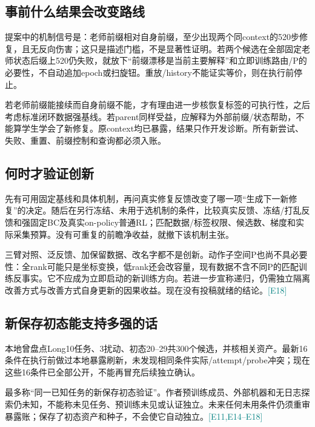 \documentclass[UTF8,a4paper,fontset=none,zihao=-4]{ctexart}
\newcommand{\ev}[1]{\textcolor{teal}{\small[#1]}}
\begin{document}
\subsection{事前什么结果会改变路线}
提案中的机制信号是：老师前缀相对自身前缀，至少出现两个同context的520步修复，且无反向伤害；这只是描述门槛，不是显著性证明。若两个候选在全部固定老师状态后缀上520仍失败，就放下“前缀漂移是当前主要解释”和立即训练路由/P的必要性，不自动追加epoch或扫旋钮。重放/history不能证实等价，则在执行前停止。

若老师前缀能接续而自身前缀不能，才有理由进一步核恢复标签的可执行性，之后考虑标准闭环数据强基线。若parent同样受益，应解释为外部前缀/状态帮助，不能算学生学会了新修复。原context均已暴露，结果只作开发诊断。所有新尝试、失败、重置、前缀控制和查询都必须入账。
\subsection{何时才验证创新}
先有可用固定基线和具体机制，再问真实修复反馈改变了哪一项“生成下一新修复”的决定。随后在另行冻结、未用于选机制的条件，比较真实反馈、冻结/打乱反馈和强固定BC及真实on-policy普通RL；匹配数据/标签权限、候选数、梯度和实际采集预算。没有可重复的前瞻净收益，就撤下该机制主张。

三臂对照、泛反馈、加保留数据、改名字都不是创新。动作子空间P也尚不具必要性：全rank可能只是坐标变换，低rank还会改容量，现有数据不含不同P的匹配训练反事实。它不应成为立即启动的新训练方向。若进一步宣称递归，仍需独立隔离改善方式与改善方式自身更新的因果收益。现在没有投稿就绪的结论。\ev{E18}
\subsection{新保存初态能支持多强的话}
本地曾盘点Long10任务、3扰动、初态20--29共300个候选，并核相关资产。最新16条件在执行前做过本地暴露刷新，未发现相同条件实际/attempt/probe冲突；现在这些16条件已全部公开，不能再冒充后续独立确认。

最多称“同一已知任务的新保存初态验证”。作者预训练成员、外部机器和无日志探索仍未知，不能称未见任务、预训练未见或认证独立。未来任何未用条件仍须重审暴露账；保存了初态资产和种子，不会使它自动独立。\ev{E11,E14--E18}
\end{document}
